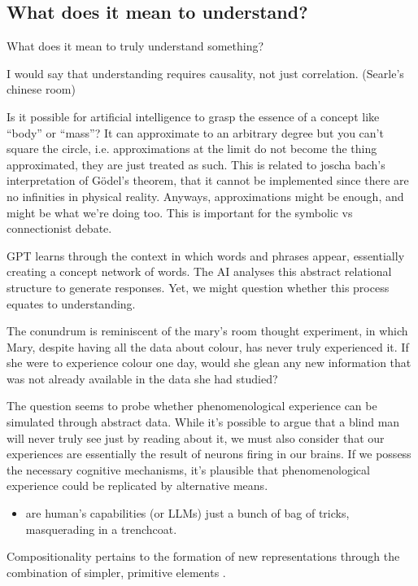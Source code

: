 \subsection{What does it mean to understand?}
What does it mean to truly understand something? 

I would say that understanding requires causality, not just correlation. (Searle's chinese room)

Is it possible for artificial intelligence to grasp the essence of a concept like “body” or “mass”? It can approximate to an arbitrary degree but you can't square the circle, i.e. approximations at the limit do not become the thing approximated, they are just treated as such. This is related to joscha bach's interpretation of Gödel's theorem, that it cannot be implemented since there are no infinities in physical reality. Anyways, approximations might be enough, and might be what we're doing too. This is important for the symbolic vs connectionist debate.

GPT learns through the context in which words and phrases appear, essentially creating a concept network of words. The AI analyses this abstract relational structure to generate responses. Yet, we might question whether this process equates to understanding.

The conundrum is reminiscent of the mary's room thought experiment, in which Mary, despite having all the data about colour, has never truly experienced it. If she were to experience colour one day, would she glean any new information that was not already available in the data she had studied?

The question seems to probe whether phenomenological experience can be simulated through abstract data. While it's possible to argue that a blind man will never truly see just by reading about it, we must also consider that our experiences are essentially the result of neurons firing in our brains. If we possess the necessary cognitive mechanisms, it's plausible that phenomenological experience could be replicated by alternative means.


\begin{itemize}
    \item are human's capabilities (or LLMs) just a bunch of bag of tricks, masquerading in a trenchcoat.
\end{itemize}


Compositionality pertains to the formation of new representations through the combination of simpler, primitive elements \cite{Lake_Ullman_Tenenbaum_Gershman_2017}.

